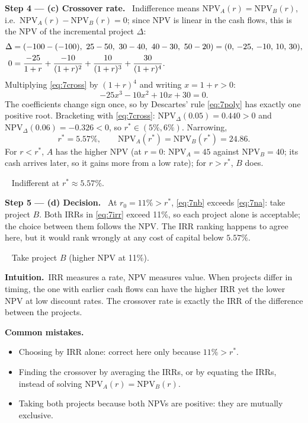 \documentclass[11pt,a4paper]{article}
\numberwithin{equation}{section}
\newcommand{\step}[2]{\par\medskip\noindent\textbf{Step #1 --- #2.}~}
\newcommand{\intuition}[1]{\par\medskip\noindent\textbf{Intuition.}~#1}
\newcommand{\answer}[1]{\par\smallskip\noindent\fbox{\textbf{Answer #1.}}~}
\newcommand{\pitfalls}{\par\medskip\noindent\textbf{Common mistakes.}}
\begin{document}
\step{4}{(c) Crossover rate} Indifference means $\mathrm{NPV}_A(r)=\mathrm{NPV}_B(r)$, i.e.\
$\mathrm{NPV}_A(r)-\mathrm{NPV}_B(r)=0$; since NPV is linear in the cash flows, this is the NPV of
the incremental project $\Delta$:
\begin{align}
  \Delta &= (-100-(-100),\ 25-50,\ 30-40,\ 40-30,\ 50-20) = (0,\,-25,\,-10,\,10,\,30), \notag\\
  0 &= \frac{-25}{1+r} + \frac{-10}{(1+r)^2} + \frac{10}{(1+r)^3} + \frac{30}{(1+r)^4}. \label{eq:7cross}
\end{align}
Multiplying \eqref{eq:7cross} by $(1+r)^4$ and writing $x=1+r>0$:
\begin{equation}\label{eq:7poly}
  -25x^3 - 10x^2 + 10x + 30 = 0.
\end{equation}
The coefficients change sign once, so by Descartes' rule \eqref{eq:7poly} has exactly one
positive root. Bracketing with \eqref{eq:7cross}: $\mathrm{NPV}_\Delta(0.05)=0.440>0$ and
$\mathrm{NPV}_\Delta(0.06)=-0.326<0$, so $r^\ast\in(5\%,6\%)$. Narrowing,
\begin{equation}\label{eq:7rstar}
  r^\ast = 5.57\%, \qquad \mathrm{NPV}_A(r^\ast) = \mathrm{NPV}_B(r^\ast) = 24.86.
\end{equation}
For $r<r^\ast$, $A$ has the higher NPV (at $r=0$: $\mathrm{NPV}_A=45$ against $\mathrm{NPV}_B=40$;
its cash arrives later, so it gains more from a low rate); for $r>r^\ast$, $B$ does.

\answer{(c)} Indifferent at $r^\ast\approx5.57\%$.

\step{5}{(d) Decision} At $r_0=11\%>r^\ast$, \eqref{eq:7nb} exceeds \eqref{eq:7na}: take project
$B$. Both IRRs in \eqref{eq:7irr} exceed 11\%, so each project alone is acceptable; the choice
between them follows the NPV. The IRR ranking happens to agree here, but it would rank wrongly
at any cost of capital below $5.57\%$.

\answer{(d)} Take project $B$ (higher NPV at 11\%).

\intuition{IRR measures a rate, NPV measures value. When projects differ in timing, the one with
earlier cash flows can have the higher IRR yet the lower NPV at low discount rates. The
crossover rate is exactly the IRR of the difference between the projects.}

\pitfalls
\begin{itemize}
  \item Choosing by IRR alone: correct here only because $11\%>r^\ast$.
  \item Finding the crossover by averaging the IRRs, or by equating the IRRs, instead of solving
        $\mathrm{NPV}_A(r)=\mathrm{NPV}_B(r)$.
  \item Taking both projects because both NPVs are positive: they are mutually exclusive.
\end{itemize}
\end{document}
